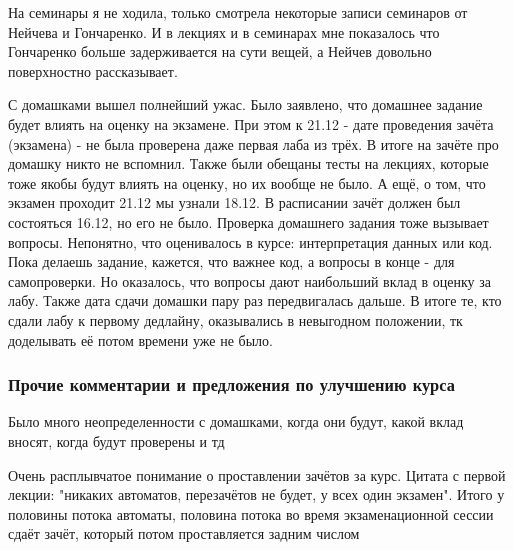             \begin{commentbox} 
                На семинары я не ходила, только смотрела некоторые записи семинаров от Нейчева и Гончаренко. И в лекциях и в семинарах мне показалось что Гончаренко больше задерживается на сути вещей, а Нейчев довольно поверхностно рассказывает. 
            \end{commentbox} 
        
            \begin{commentbox} 
                С домашками вышел полнейший ужас. Было заявлено, что домашнее задание будет влиять на оценку на экзамене. При этом к 21.12 - дате проведения зачёта (экзамена) - не была проверена даже первая лаба из трёх. В итоге на зачёте про домашку никто не вспомнил.
                Также были обещаны тесты на лекциях, которые тоже якобы будут влиять на оценку, но их вообще не было.
                А ещё, о том, что экзамен проходит 21.12 мы узнали 18.12. В расписании зачёт должен был состояться 16.12, но его не было.
                Проверка домашнего задания тоже вызывает вопросы. Непонятно, что оценивалось в курсе: интерпретация данных или код. Пока делаешь задание, кажется, что важнее код, а вопросы в конце - для самопроверки. Но оказалось, что вопросы дают наибольший вклад в оценку за лабу.
                Также дата сдачи домашки пару раз передвигалась дальше. В итоге те, кто сдали лабу к первому дедлайну, оказывались в невыгодном положении, тк доделывать её потом времени уже не было. 
            \end{commentbox} 
        
    \subsubsection{Прочие комментарии и предложения по улучшению курса}
        \begin{commentbox}
            Было много неопределенности с домашками, когда они будут, какой вклад вносят, когда будут проверены и тд  
        \end{commentbox}

        \begin{commentbox}
            Очень расплывчатое понимание о проставлении зачётов за курс. Цитата с первой лекции: "никаких автоматов, перезачётов не будет, у всех один экзамен". Итого у половины потока автоматы, половина потока во время экзаменационной сессии сдаёт зачёт, который потом проставляется задним числом
        \end{commentbox}

